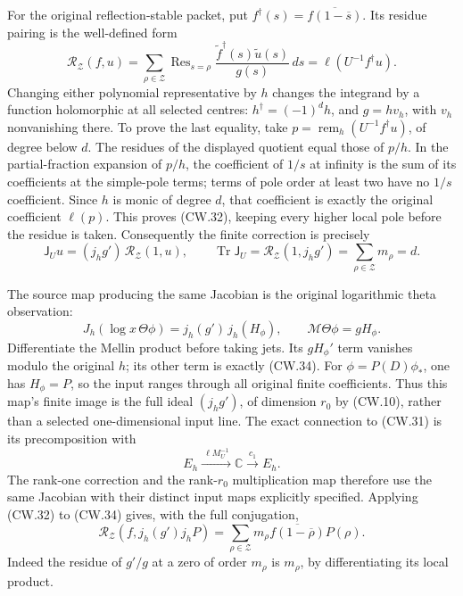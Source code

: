 For the original reflection-stable packet, put
\(f^\dagger(s)=\overline{f(1-\overline s)}\).
Its residue pairing is the well-defined form
\[
 \mathscr R_{\mathcal Z}(f,u)
  =\sum_{\rho\in\mathcal Z}
      \operatorname{Res}_{s=\rho}
       \frac{\widetilde f^\dagger(s)\widetilde u(s)}{g(s)}\,ds
  =\ell(U^{-1}f^\dagger u).
 \tag{CW.32}
\]
Changing either polynomial representative by \(h\) changes
the integrand by a function holomorphic at all selected
centres: \(h^\dagger=(-1)^dh\), and \(g=hv_h\), with
\(v_h\) nonvanishing there.
To prove the last equality, take
\(p=\operatorname{rem}_h(U^{-1}f^\dagger u)\), of degree
below \(d\).  The residues of the displayed quotient equal
those of \(p/h\).  In the partial-fraction expansion of
\(p/h\), the coefficient of \(1/s\) at infinity is the
sum of its coefficients at the simple-pole terms; terms
of pole order at least two have no \(1/s\) coefficient.
Since \(h\) is monic of degree \(d\), that coefficient is
exactly the original coefficient \(\ell(p)\).
This proves (CW.32), keeping every higher local pole before
the residue is taken.
Consequently the finite correction is precisely
\[
 \boxed{\mathsf J_Uu=(j_hg')\,\mathscr R_{\mathcal Z}(1,u),
 \qquad
 \operatorname{Tr}\mathsf J_U
      =\mathscr R_{\mathcal Z}(1,j_hg')
      =\sum_{\rho\in\mathcal Z}m_\rho=d.}
 \tag{CW.33}
\]

The source map producing the same Jacobian is the original
logarithmic theta observation:
\[
 J_h(\log x\,\Theta\phi)=j_h(g')\,j_h(H_\phi),\qquad
 \mathcal M\Theta\phi=gH_\phi .
 \tag{CW.34}
\]
Differentiate the Mellin product before taking jets.
Its \(gH_\phi'\) term vanishes modulo the original \(h\);
its other term is exactly (CW.34).
For \(\phi=P(D)\phi_*\), one has \(H_\phi=P\), so the
input ranges through all original finite coefficients.
Thus this map's finite image is the full ideal \((j_hg')\),
of dimension \(r_0\) by (CW.10), rather than a selected
one-dimensional input line.
The exact connection to (CW.31) is its precomposition with
\[
 E_h\xrightarrow{\ \ell M_U^{-1}\ }\mathbb C
                   \xrightarrow{\ c_1\ }E_h.
 \tag{CW.35}
\]
The rank-one correction and the rank-\(r_0\) multiplication
map therefore use the same Jacobian with their distinct
input maps explicitly specified.
Applying (CW.32) to (CW.34) gives, with the full conjugation,
\[
 \mathscr R_{\mathcal Z}(f,j_h(g')j_hP)
  =\sum_{\rho\in\mathcal Z}
       m_\rho\overline{f(1-\overline\rho)}P(\rho).
 \tag{CW.36}
\]
Indeed the residue of \(g'/g\) at a zero of order \(m_\rho\)
is \(m_\rho\), by differentiating its local product.

